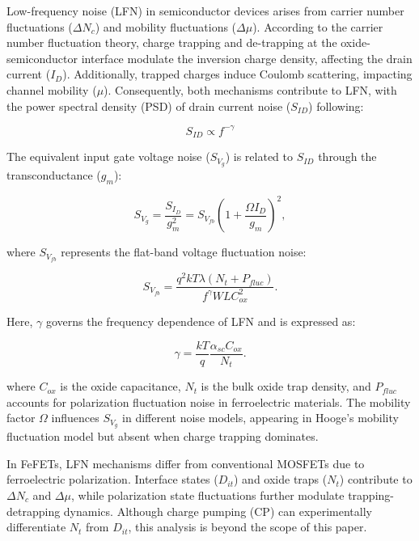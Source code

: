 Low-frequency noise (LFN) in semiconductor devices arises from carrier number fluctuations ($\Delta N_c$) and mobility fluctuations ($\Delta \mu$). According to the carrier number fluctuation theory, charge trapping and de-trapping at the oxide-semiconductor interface modulate the inversion charge density, affecting the drain current ($I_D$). Additionally, trapped charges induce Coulomb scattering, impacting channel mobility ($\mu$). Consequently, both mechanisms contribute to LFN, with the power spectral density (PSD) of drain current noise ($S_{ID}$) following:

\begin{equation} S_{ID} \propto f^{-\gamma} \label{eqn:SID} \end{equation}

The equivalent input gate voltage noise ($S_{V_g}$) is related to $S_{ID}$ through the transconductance ($g_m$):

\begin{equation} S_{V_g} = \frac{S_{I_D}}{g_m^2} = S_{V_{fb}} \left( 1+\frac{\Omega I_D}{g_m} \right)^{2}, \label{equ:SvG} \end{equation}

where $S_{V_{fb}}$ represents the flat-band voltage fluctuation noise:

\begin{equation} S_{V_{fb}} = \frac{q^2 kT \lambda (N_t+P_{fluc})}{f^{\gamma} W L C_{ox}^2}. \label{equ:flat_band} \end{equation}

Here, $\gamma$ governs the frequency dependence of LFN and is expressed as:

\begin{equation} \gamma = \frac{kT}{q}\frac{\alpha_{sc}C_{ox}}{N_t}. \end{equation}

where $C_{ox}$ is the oxide capacitance, $N_t$ is the bulk oxide trap density, and $P_{fluc}$ accounts for polarization fluctuation noise in ferroelectric materials. The mobility factor $\Omega$ influences $S_{V_g}$ in different noise models, appearing in Hooge’s mobility fluctuation model but absent when charge trapping dominates.

In FeFETs, LFN mechanisms differ from conventional MOSFETs due to ferroelectric polarization. Interface states ($D_{it}$) and oxide traps ($N_t$) contribute to $\Delta N_c$ and $\Delta \mu$, while polarization state fluctuations further modulate trapping-detrapping dynamics. Although charge pumping (CP) can experimentally differentiate $N_t$ from $D_{it}$, this analysis is beyond the scope of this paper.

